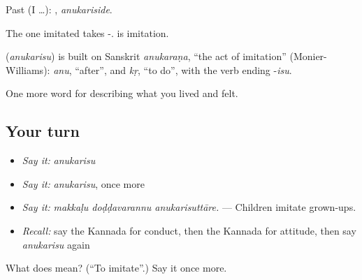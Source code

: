 Past (I …): , \emph{anukariside}.

The one imitated takes -.  is imitation.

\begin{cousinweb}
\textbf{} (\emph{anukarisu}) is built on Sanskrit \emph{anukaraṇa}, \textquotedblleft{}the act of imitation\textquotedblright{} (Monier-Williams): \emph{anu}, \textquotedblleft{}after\textquotedblright{}, and \emph{kṛ}, \textquotedblleft{}to do\textquotedblright{}, with the verb ending -\emph{isu}.
\end{cousinweb}

\begin{grammarlens}[title={What you've built}]
One more word for describing what you lived and felt.
\end{grammarlens}

\subsection*{Your turn}
\begin{itemize}
\raggedright
  \item \emph{Say it:} \emph{anukarisu}
  \item \emph{Say it:} \emph{anukarisu}, once more
  \item \emph{Say it:} \emph{makkaḷu doḍḍavarannu anukarisuttāre.} — Children imitate grown-ups.
  \item \emph{Recall:} say the Kannada for conduct, then the Kannada for attitude, then say \emph{anukarisu} again
\end{itemize}

\begin{tcolorbox}[breakable,colback=teal!4,colframe=teal!35!black,title={Before you move on}]
What does  mean? (\textquotedblleft{}To imitate\textquotedblright{}.) Say it once more.
\end{tcolorbox}
